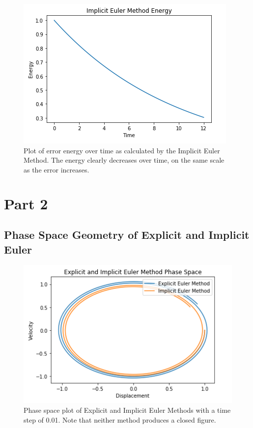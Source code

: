 \documentclass{article}
\begin{document}
\begin{figure}[ht]
\centering
\includegraphics[scale=0.35]{imp_euler_energy.png}
\caption{Plot of error energy over time as calculated by the Implicit Euler Method. The energy clearly decreases over time, on the same scale as the error increases.}
\label{fig:impeulerenergy}
\end{figure}

\break

\section{Part 2}


\subsection{Phase Space Geometry of Explicit and Implicit Euler}

\begin{figure}[ht]
\centering
\includegraphics[scale=0.35]{exp_imp_phase.png}
\caption{Phase space plot of Explicit and Implicit Euler Methods with a time step of 0.01. Note that neither method produces a closed figure.}
\label{fig:expimpphase}
\end{figure}
\end{document}
